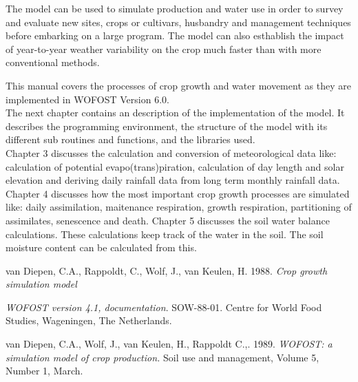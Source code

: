 \documentclass[11pt]{article}
\begin{document}
\bigskip
\bigskip
\bigskip
\bigskip
\bigskip
\bigskip
\bigskip
\bigskip
 

\bigskip
\bigskip
\bigskip
\bigskip
The model can
be used to
simulate pro\-duction and
water use in
order to survey
and evaluate
new sites, crops
or cultivars, husbandry and management techniques before embarking on a large
program. The model can also esthablish the impact of year-to-year weather variability
on the crop much faster than with more conventional methods. 

This manual covers the processes of crop growth and water movement as they are
implement\-ed in WOFOST Version 6.0. \\
The next chapter contains an description of the implementation of the model. It
describes the programming environment, the structure of the model with its different
sub routines and functions, and the libraries used.\\
Chapter 3 discusses the calculation and conversion of meteorological data like:
calculation of potential evapo(trans)piration, calculation of day length and solar
elevation and deriving daily rainfall data from long term monthly rainfall data.\\
Chapter 4 discusses how the most important crop growth processes are simulated
like: daily assimilation, maitenance respiration, growth respiration, partitioning of
assimilates, senes\-cence and death. Chapter 5 discusses the soil water balance
calculations. These calculations keep track of the water in the soil. The soil moisture
content can be calculated from this. 


\newpage
van Diepen, C.A., Rappoldt, C., Wolf, J., van Keulen, H. 1988. {\it Crop growth simula\-tion model \/}
\testlastline

\begin{indenting}{2.54cm}
{\it WOFOST version 4.1, documentation\/}. SOW-88-01. Centre for World
Food Studies, Wage\-ningen, The Netherlands.
\end{indenting}
van Diepen, C.A., Wolf, J., van Keulen, H., Rappoldt C.,. 1989. {\it WOFOST: a simula\-tion model of crop production. \/}Soil use and management, Volume 5, Number 1,
March.
\end{document}
